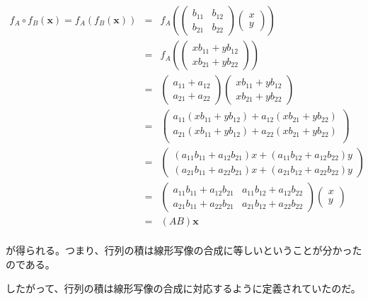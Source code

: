\documentclass[dvipdfmx,autodetect-engine]{jsarticle}
\begin{document}
\begin{eqnarray*}
f_A \circ f_B(\bm{x}) = f_A(f_B(\bm{x})) &= &f_A(\begin{pmatrix}
b_{11} & b_{12} \\
b_{21} & b_{22}
\end{pmatrix} \begin{pmatrix}
x \\
y
\end{pmatrix}) \\
&= &f_A(\begin{pmatrix}
xb_{11} + yb_{12} \\
xb_{21} + yb_{22}
\end{pmatrix}) \\
&= &\begin{pmatrix}
a_{11} + a_{12} \\
a_{21} + a_{22}
\end{pmatrix} 
\begin{pmatrix}
xb_{11} + yb_{12} \\
xb_{21} + yb_{22}
\end{pmatrix} \\
& = &\begin{pmatrix}
a_{11}(xb_{11} + yb_{12}) + a_{12}(xb_{21} + yb_{22}) \\
a_{21}(xb_{11} + yb_{12}) + a_{22}(xb_{21} + yb_{22}) \\
\end{pmatrix} \\
& = &\begin{pmatrix}
(a_{11}b_{11} + a_{12}b_{21})x + (a_{11}b_{12} + a_{12}b_{22})y \\
(a_{21}b_{11} + a_{22}b_{21})x + (a_{21}b_{12} + a_{22}b_{22})y
\end{pmatrix} \\
& = &\begin{pmatrix}
a_{11}b_{11} + a_{12}b_{21} & a_{11}b_{12} + a_{12}b_{22} \\
a_{21}b_{11} + a_{22}b_{21} & a_{21}b_{12} + a_{22}b_{22}
\end{pmatrix}
\begin{pmatrix}
x \\
y
\end{pmatrix} \\
&= &(AB)\bm{x} \\
\end{eqnarray*}

が得られる。つまり、行列の積は線形写像の合成に等しいということが分かったのである。

したがって、行列の積は線形写像の合成に対応するように定義されていたのだ。
\end{document}
